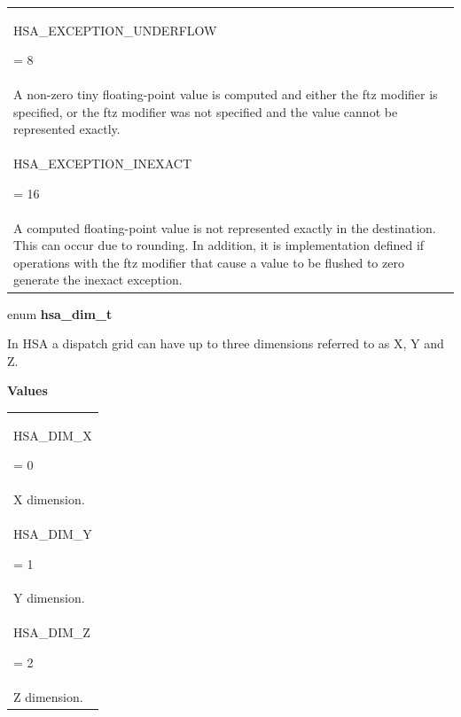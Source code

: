 \documentclass[final]{book}
\newcommand{\reftyp}[1]{#1}
\newcommand{\refenu}[1]{\reftyp{#1}}
\begin{document}
\begin{appendices}
\begin{longtable}{@{\hspace{2em}}p{\linewidth-2em}}
\hspace{-2em}\hypertarget{group--FinalizerCoreApi-1gga1bb9da9f1f4527de3a54d5fdc5d24ef1a69dfa64c0e6f858f1b5f0dfe570ad19e}{\refenu{HSA_EXCEPTION_UNDERFLOW}} = 8\\A non-zero tiny floating-point value is computed and either the ftz modifier is specified, or the ftz modifier was not specified and the value cannot be represented exactly.\\[2mm]
\hspace{-2em}\hypertarget{group--FinalizerCoreApi-1gga1bb9da9f1f4527de3a54d5fdc5d24ef1ad3d262ab944f03c45ec546c2cacb9080}{\refenu{HSA_EXCEPTION_INEXACT}} = 16\\A computed floating-point value is not represented exactly in the destination. This can occur due to rounding. In addition, it is implementation defined if operations with the ftz modifier that cause a value to be flushed to zero generate the inexact exception.
\end{longtable}

\noindent\begin{tcolorbox}[nobeforeafter,arc=0mm,colframe=white,colback=lightgray,left=0mm]
enum \hypertarget{group--FinalizerCoreApi-1gaa7eb83c51012a3b6f016f7b3388964ef}{\textbf{hsa_dim_t}}
\end{tcolorbox}
In HSA a dispatch grid can have up to three dimensions referred to as X, Y and Z.

\noindent\textbf{Values}\\[-5mm]
\begin{longtable}{@{\hspace{2em}}p{\linewidth-2em}}
\hspace{-2em}\hypertarget{group--FinalizerCoreApi-1ggaa7eb83c51012a3b6f016f7b3388964efa5a172a4cf084b71b9bafd68eaf159efc}{\refenu{HSA_DIM_X}} = 0\\X dimension.\\[2mm]
\hspace{-2em}\hypertarget{group--FinalizerCoreApi-1ggaa7eb83c51012a3b6f016f7b3388964efa863557e1bf7f7ba4f7ac00527f214d0e}{\refenu{HSA_DIM_Y}} = 1\\Y dimension.\\[2mm]
\hspace{-2em}\hypertarget{group--FinalizerCoreApi-1ggaa7eb83c51012a3b6f016f7b3388964efaa2ea7a7aba09bb743508177f196d2983}{\refenu{HSA_DIM_Z}} = 2\\Z dimension.
\end{longtable}


\end{appendices}
\end{document}
